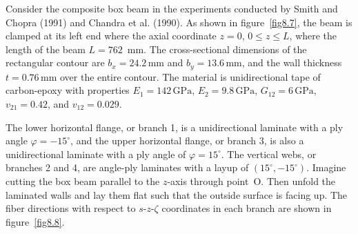 \documentclass{AeroStructure-ERJohnson}
\begin{document}
\begin{example*}\label{ex8.4}Consider the composite box beam in the experiments conducted by
Smith and Chopra (1991) and Chandra et al. (1990). As shown in
figure~\ref{fig8.7}, the beam is clamped at its left end where the
axial coordinate $z=0$, $0 \leq z \leq L$, where the length of the
beam $L = 762$~mm. The cross-sectional dimensions of the
rectangular contour are $b_{x}=24.2\,\mathrm{mm}$ and
$b_{y}=13.6\,\mathrm{mm}$, and the wall thickness
$t=0.76\,\mathrm{mm}$ over the entire contour. The material is
unidirectional tape of carbon-epoxy with properties
$E_{1}=142\,\mathrm{GPa}$, $E_{2}=9.8\,\mathrm{GPa}$,
$G_{12}=6\,\mathrm{GPa}$, $v_{21}=0.42$, and $v_{12}=0.029$.


The lower horizontal flange, or branch 1, is a unidirectional
laminate with a ply angle $\varphi=-15^{\circ}$, and the upper
horizontal flange, or branch 3, is also a unidirectional laminate
with a ply angle of $\varphi=15^{\circ}$. The vertical webs, or
branches 2 and 4, are angle-ply laminates with a layup of
$\left(15^{\circ},-15^{\circ}\right)$. Imagine cutting the box
beam parallel to the $z$-axis through point~O. Then unfold the
laminated walls and lay them flat such that the outside surface is
facing up. The fiber directions with respect to $s$-$z$-$\zeta$
coordinates in each branch are shown in figure~\ref{fig8.8}.



\end{example*}
\end{document}
